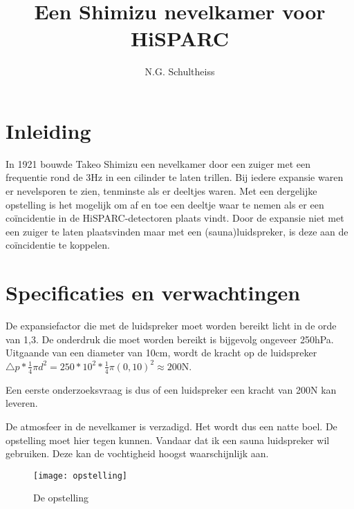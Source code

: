 



\title{Een Shimizu nevelkamer voor HiSPARC}
\author{N.G. Schultheiss}
\date{}

\maketitle
\thispagestyle{firststyle}

\section{Inleiding}

In 1921 bouwde Takeo Shimizu een nevelkamer door een zuiger met een
frequentie rond de 3Hz in een cilinder te laten trillen. Bij iedere
expansie waren er nevelsporen te zien, tenminste als er deeltjes waren.
Met een dergelijke opstelling is het mogelijk om af en toe een deeltje
waar te nemen als er een coïncidentie in de HiSPARC-detectoren plaats
vindt. Door de expansie niet met een zuiger te laten plaatsvinden
maar met een (sauna)luidspreker, is deze aan de coïncidentie te koppelen.


\section{Specificaties en verwachtingen}

De expansiefactor die met de luidspreker moet worden bereikt licht
in de orde van 1,3. De onderdruk die moet worden bereikt is bijgevolg
ongeveer 250hPa. Uitgaande van een diameter van 10cm, wordt de kracht
op de luidspreker $\triangle p*\frac{1}{4}\pi d^{2}=250*10^{2}*\frac{1}{4}\pi(0,10)^{2}\approx200\mathrm{N}$.

Een eerste onderzoeksvraag is dus of een luidspreker een kracht van
200N kan leveren.

De atmosfeer in de nevelkamer is verzadigd. Het wordt dus een natte
boel. De opstelling moet hier tegen kunnen. Vandaar dat ik een sauna
luidspreker wil gebruiken. Deze kan de vochtigheid hoogst waarschijnlijk
aan. 

\begin{figure}[h]
\noindent \begin{centering}
\texttt{[image: opstelling]}
\par\end{centering}

\caption{De opstelling}
\end{figure}


